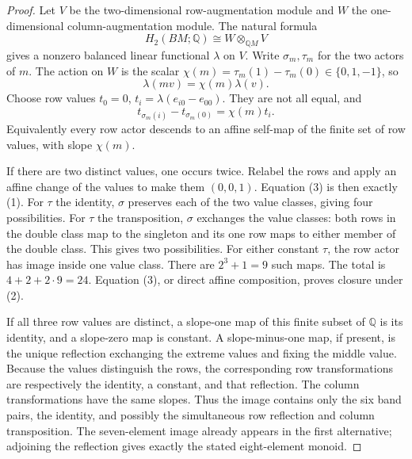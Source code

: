 \begin{proof}
Let $V$ be the two-dimensional row-augmentation module and
$W$ the one-dimensional column-augmentation module.
The natural formula
\[
             H_2(BM;\mathbb Q)
                    \cong W\otimes_{\mathbb QM}V
\]
gives a nonzero balanced linear functional $\lambda$ on $V$.
Write $\sigma_m,\tau_m$ for the two actors of $m$.
The action on $W$ is the scalar
$\chi(m)=\tau_m(1)-\tau_m(0)\in\{0,1,-1\}$, so
\[
       \lambda(mv)=\chi(m)\lambda(v).
\]
Choose row values $t_0=0$,
$t_i=\lambda(e_{i0}-e_{00})$.  They are not all equal, and
\[
 t_{\sigma_m(i)}-t_{\sigma_m(0)}=\chi(m)t_i.                    \tag{3}
\]
Equivalently every row actor descends to an affine self-map
of the finite set of row values, with slope $\chi(m)$.

If there are two distinct values, one occurs twice.
Relabel the rows and apply an affine change of the values
to make them $(0,0,1)$.  Equation (3) is then exactly (1).
For $\tau$ the identity, $\sigma$ preserves each of the
two value classes, giving four possibilities.
For $\tau$ the transposition, $\sigma$ exchanges the
value classes: both rows in the double class map to the
singleton and its one row maps to either member of the
double class.  This gives two possibilities.
For either constant $\tau$, the row actor has image
inside one value class.  There are $2^3+1=9$ such maps.
The total is $4+2+2\cdot9=24$.
Equation (3), or direct affine composition, proves closure
under (2).

If all three row values are distinct, a slope-one map
of this finite subset of $\mathbb Q$ is its identity,
and a slope-zero map is constant.  A slope-minus-one map,
if present, is the unique reflection exchanging the
extreme values and fixing the middle value.
Because the values distinguish the rows, the corresponding
row transformations are respectively the identity,
a constant, and that reflection.  The column
transformations have the same slopes.  Thus the image
contains only the six band pairs, the identity, and
possibly the simultaneous row reflection and column
transposition.  The seven-element image already appears
in the first alternative; adjoining the reflection gives
exactly the stated eight-element monoid.
\end{proof}

